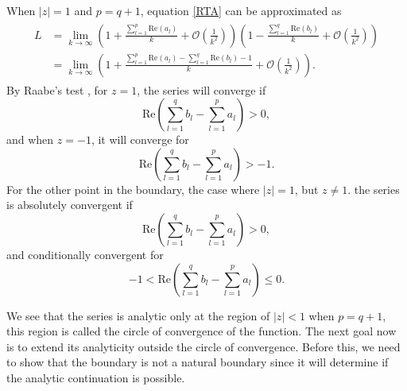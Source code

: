 When $|z| = 1$ and $p = q+1$, equation \eqref{RTA} can be approximated as
\begin{align}
\begin{split}
    L &= \lim_{k \to \infty} \left(1 + \frac{\sum_{l=1}^{p} \mathrm{Re}(a_l)}{k} + \mathcal{O}\left( \frac{1}{k^2}\right)\right) \left(1 - \frac{\sum_{l=1}^{q} \mathrm{Re}(b_l)}{k} + \mathcal{O}\left( \frac{1}{k^2}\right)\right)
    \\& = \lim_{k \to \infty} \left(1 + \frac{\sum_{l=1}^{p} \mathrm{Re}(a_l) - \sum_{l=1}^{q} \mathrm{Re}(b_l)-1} {k} + \mathcal{O}\left( \frac{1}{k^2}\right)\right).
\end{split}
\end{align}
By Raabe's test \cite{10.2307/24338342}, for $z=1$, the series will converge if
\begin{equation}
    \mathrm{Re}\left(\sum_{l=1}^{q} b_l- \sum_{l=1}^{p} a_l \right) > 0,
\end{equation}
and when $z=-1$, it will converge for 
\begin{equation}
    \mathrm{Re}\left(\sum_{l=1}^{q} b_l- \sum_{l=1}^{p} a_l \right) > -1.
\end{equation}
For the other point in the boundary, the case where $|z| = 1$, but $z \neq 1$. the series is absolutely convergent if 
\begin{equation} \label{converge}
    \mathrm{Re}\left(\sum_{l=1}^{q} b_l- \sum_{l=1}^{p} a_l \right) > 0,
\end{equation}
and conditionally convergent for
\begin{equation}
    -1 < \mathrm{Re}\left(\sum_{l=1}^{q} b_l- \sum_{l=1}^{p} a_l \right) \leq 0.
\end{equation}

We see that the series is analytic only at the region of $|z| < 1$ when $p = q +1$, this region is called the circle of convergence of the function. The next goal now is to extend its analyticity outside the circle of convergence. Before this, we need to show that the boundary is not a natural boundary since it will determine if the analytic continuation is possible. 

